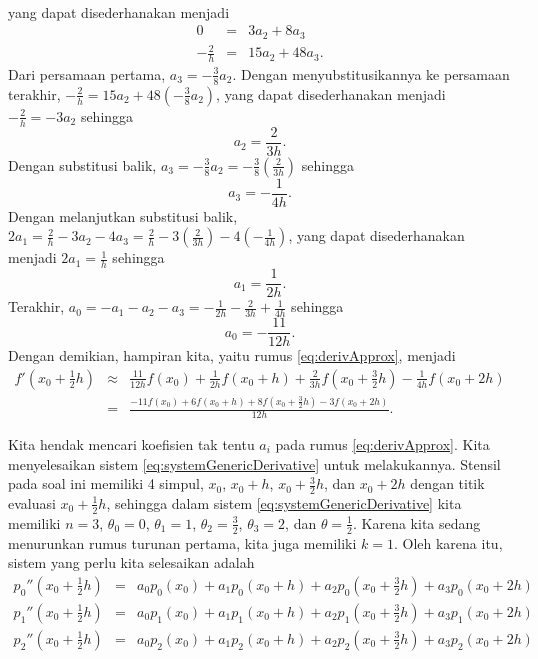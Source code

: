 \begin{description}
\begin{eqnarray*}
\end{eqnarray*}
yang dapat disederhanakan menjadi
\begin{eqnarray*}
0 & = & 3a_{2}+8a_{3}\\
-\frac{2}{h} & = & 15a_{2}+48a_{3}.
\end{eqnarray*}
Dari persamaan pertama, $a_{3}=-\frac{3}{8}a_{2}$. Dengan menyubstitusikannya
ke persamaan terakhir, $-\frac{2}{h}=15a_{2}+48(-\frac{3}{8}a_{2})$,
yang dapat disederhanakan menjadi $-\frac{2}{h}=-3a_{2}$ sehingga
\[
a_{2}=\frac{2}{3h}.
\]
Dengan substitusi balik, $a_{3}=-\frac{3}{8}a_{2}=-\frac{3}{8}(\frac{2}{3h})$
sehingga
\[
a_{3}=-\frac{1}{4h}.
\]
Dengan melanjutkan substitusi balik, $2a_{1}=\frac{2}{h}-3a_{2}-4a_{3}=\frac{2}{h}-3(\frac{2}{3h})-4(-\frac{1}{4h})$,
yang dapat disederhanakan menjadi $2a_{1}=\frac{1}{h}$ sehingga
\[
a_{1}=\frac{1}{2h}.
\]
Terakhir, $a_{0}=-a_{1}-a_{2}-a_{3}=-\frac{1}{2h}-\frac{2}{3h}+\frac{1}{4h}$
sehingga
\[
a_{0}=-\frac{11}{12h}.
\]
Dengan demikian, hampiran kita, yaitu rumus \ref{eq:derivApprox},
menjadi
\begin{eqnarray*}
f'\left(x_{0}+\frac{1}{2}h\right) & \approx & \frac{11}{12h}f(x_{0})+\frac{1}{2h}f(x_{0}+h)+\frac{2}{3h}f(x_{0}+\frac{3}{2}h)-\frac{1}{4h}f(x_{0}+2h)\\
 & = & \frac{-11f(x_{0})+6f(x_{0}+h)+8f(x_{0}+\frac{3}{2}h)-3f(x_{0}+2h)}{12h}.
\end{eqnarray*}
\item [{\ref{exc:undetermined-1}f:}] Kita hendak mencari koefisien tak
tentu $a_{i}$ pada rumus \ref{eq:derivApprox}. Kita menyelesaikan
sistem \ref{eq:systemGenericDerivative} untuk melakukannya. Stensil
pada soal ini memiliki 4 simpul, $x_{0}$, $x_{0}+h$, $x_{0}+\frac{3}{2}h$,
dan $x_{0}+2h$ dengan titik evaluasi $x_{0}+\frac{1}{2}h$, sehingga
dalam sistem \ref{eq:systemGenericDerivative} kita memiliki $n=3$,
$\theta_{0}=0$, $\theta_{1}=1$, $\theta_{2}=\frac{3}{2}$, $\theta_{3}=2$,
dan $\theta=\frac{1}{2}$. Karena kita sedang menurunkan rumus turunan
pertama, kita juga memiliki $k=1$. Oleh karena itu, sistem yang perlu
kita selesaikan adalah 
\begin{eqnarray*}
p_{0}''\left(x_{0}+\frac{1}{2}h\right) & = & a_{0}p_{0}(x_{0})+a_{1}p_{0}(x_{0}+h)+a_{2}p_{0}(x_{0}+\frac{3}{2}h)+a_{3}p_{0}(x_{0}+2h)\\
p_{1}''\left(x_{0}+\frac{1}{2}h\right) & = & a_{0}p_{1}(x_{0})+a_{1}p_{1}(x_{0}+h)+a_{2}p_{1}(x_{0}+\frac{3}{2}h)+a_{3}p_{1}(x_{0}+2h)\\
p_{2}''\left(x_{0}+\frac{1}{2}h\right) & = & a_{0}p_{2}(x_{0})+a_{1}p_{2}(x_{0}+h)+a_{2}p_{2}(x_{0}+\frac{3}{2}h)+a_{3}p_{2}(x_{0}+2h)\\

\end{eqnarray*}
\end{description}
